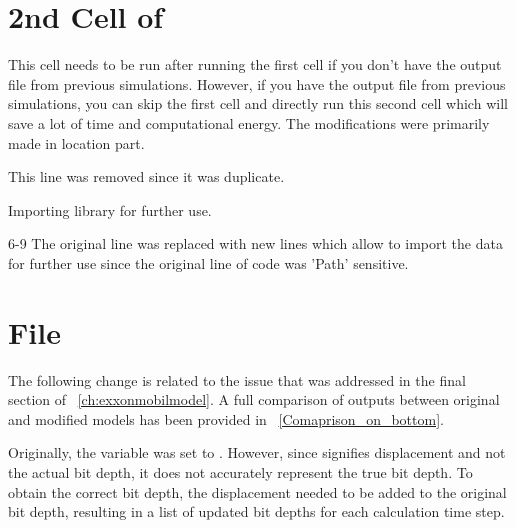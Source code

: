 \section{2nd Cell of }
This cell needs to be run after running the first cell if you don't have the output file from previous simulations. However, if you have the output file from previous simulations, you can skip the first cell and directly run this second cell which will save a lot of time and computational energy. The modifications were primarily made in location part. 
\begin{codemodifications}

\begin{codemodification}{1}
This line was removed since it was duplicate.
\end{codemodification}

\begin{codemodification}{5}
Importing  library for further use.
\end{codemodification}

\begin{codemodification}{6-9}
The original line was replaced with new lines which allow to import the data for further use since the original line of code was 'Path' sensitive.
\end{codemodification}

\end{codemodifications} 

\section{File }
The following change is related to the issue that was addressed in the final section of \chaptername~\ref{ch:exxonmobilmodel}.
A full comparison of outputs between original and modified models has been provided in \figurename~\ref{Comaprison_on_bottom}.
\begin{codemodifications}

\begin{codemodification}{29}
Originally, the variable  was set to . However, since  signifies displacement and not the actual bit depth, it does not accurately represent the true bit depth. To obtain the correct bit depth, the displacement needed to be added to the original bit depth, resulting in a list of updated bit depths for each calculation time step.
\end{codemodification}
\end{codemodifications}

